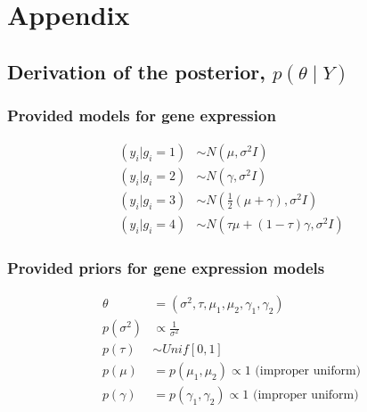 \documentclass{article}
\begin{document}
{\small


}

\section{Appendix}
\subsection{Derivation of the posterior, $p(\theta \mid Y)$}
\label{sec:a_post}
\subsubsection{Provided models for gene expression}
\begin{align*}
  (y_i | g_i = 1) &\sim N(\mu, \sigma^2 I)\\
  (y_i | g_i = 2) &\sim N(\gamma, \sigma^2 I)\\
  (y_i | g_i = 3) &\sim N(\frac{1}{2}(\mu + \gamma), \sigma^2 I)\\
  (y_i | g_i = 4) &\sim N(\tau\mu + (1-\tau)\gamma, \sigma^2 I)
\end{align*}
\subsubsection{Provided priors for gene expression models}
\begin{align*}
  \theta &= (\sigma^2, \tau, \mu_1, \mu_2, \gamma_1, \gamma_2)\\
  p(\sigma^2) &\propto \frac{1}{\sigma^2}\\
  p(\tau) &\sim Unif[0, 1]\\
  p(\mu) &= p(\mu_1, \mu_2) \propto 1 \textrm{ (improper uniform)}\\
  p(\gamma) &= p(\gamma_1, \gamma_2) \propto 1 \textrm{ (improper uniform)}\\
\end{align*}
\end{document}
